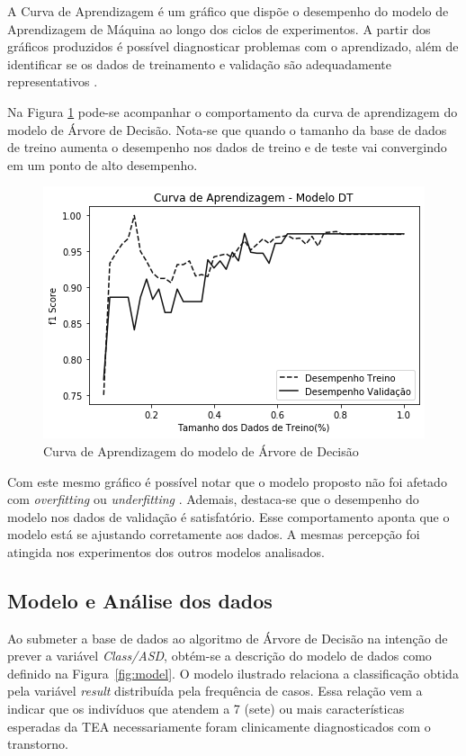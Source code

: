 \documentclass{template/sig-alternate-05-2015}
\begin{document}
    A Curva de Aprendizagem é um gráfico que dispõe o desempenho do
    modelo de Aprendizagem de Máquina ao longo dos ciclos de
    experimentos. A partir dos gráficos produzidos é possível
    diagnosticar problemas com o aprendizado, além de identificar se
    os dados de treinamento e validação são adequadamente
    representativos \cite{joel,HAYKIN:2001,zhang2019overfitting}.

    Na Figura \ref{fig:feature1} pode-se acompanhar o comportamento da
    curva de aprendizagem do modelo de Árvore de Decisão. Nota-se que
    quando o tamanho da base de dados de treino aumenta o desempenho
    nos dados de treino e de teste vai convergindo em um ponto de alto
    desempenho.

    \begin{figure}[!h]
      \centering
      \includegraphics[width=.5\textwidth]{imagens/ca_ad.png}
      \caption{Curva de Aprendizagem do modelo de Árvore de Decisão}
      \label{fig:feature1}
    \end{figure}

    Com este mesmo gráfico é possível notar que o modelo proposto não
    foi afetado com \textit{overfitting} ou \textit{underfitting}
    \cite{HAYKIN:2001,zhang2019overfitting}. Ademais, destaca-se que o
    desempenho do modelo nos dados de validação é satisfatório. Esse
    comportamento aponta que o modelo está se ajustando corretamente
    aos dados. A mesmas percepção foi atingida nos experimentos dos
    outros modelos analisados.

    \subsection{Modelo e Análise dos dados}

    Ao submeter a base de dados ao algoritmo de Árvore de Decisão na
    intenção de prever a variável \emph{Class/ASD}, obtém-se a
    descrição do modelo de dados como definido na
    Figura~\ref{fig:model}. O modelo ilustrado relaciona a
    classificação obtida pela variável \emph{result} distribuída pela
    frequência de casos. Essa relação vem a indicar que os indivíduos
    que atendem a 7 (sete) ou mais características esperadas da TEA
    necessariamente foram clinicamente diagnosticados com o
    transtorno.\\
\end{document}
